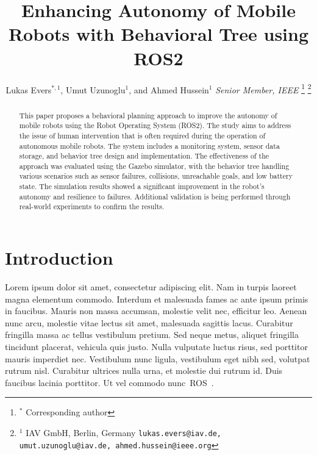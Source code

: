 \documentclass[letterpaper, 10pt, conference]{ieeeconf}
\begin{document}
\title{Enhancing Autonomy of Mobile Robots with Behavioral Tree using ROS2}

\author{Lukas Evers$^{*,1}$, Umut Uzunoglu$^{1}$, and Ahmed Hussein$^{1}$ \textit{Senior Member, IEEE}%
    \thanks{$^{*}$ Corresponding author }%
    \thanks{$^{1}$ IAV GmbH, Berlin, Germany \newline
		{\tt\small lukas.evers@iav.de, umut.uzunoglu@iav.de, ahmed.hussein@ieee.org}}%
}

\maketitle
\pagestyle{empty}


\begin{abstract}

This paper proposes a behavioral planning approach to improve the autonomy of mobile robots using the Robot Operating System (ROS2). The study aims to address the issue of human intervention that is often required during the operation of autonomous mobile robots. The system includes a monitoring system, sensor data storage, and behavior tree design and implementation. The effectiveness of the approach was evaluated using the Gazebo simulator, with the behavior tree handling various scenarios such as sensor failures, collisions, unreachable goals, and low battery state. The simulation results showed a significant improvement in the robot's autonomy and resilience to failures. Additional validation is being performed through real-world experiments to confirm the results.

\end{abstract}


\section{Introduction}
\label{sec:Introduction}

 Lorem ipsum dolor sit amet, consectetur adipiscing elit. Nam in turpis laoreet magna elementum commodo. Interdum et malesuada fames ac ante ipsum primis in faucibus. Mauris non massa accumsan, molestie velit nec, efficitur leo. Aenean nunc arcu, molestie vitae lectus sit amet, malesuada sagittis lacus. Curabitur fringilla massa ac tellus vestibulum pretium. Sed neque metus, aliquet fringilla tincidunt placerat, vehicula quis justo. Nulla vulputate luctus risus, sed porttitor mauris imperdiet nec. Vestibulum nunc ligula, vestibulum eget nibh sed, volutpat rutrum nisl. Curabitur ultrices nulla urna, et molestie dui rutrum id. Duis faucibus lacinia porttitor. Ut vel commodo nunc~\gls{ROS}~\cite{quigley2009}.
\end{document}
